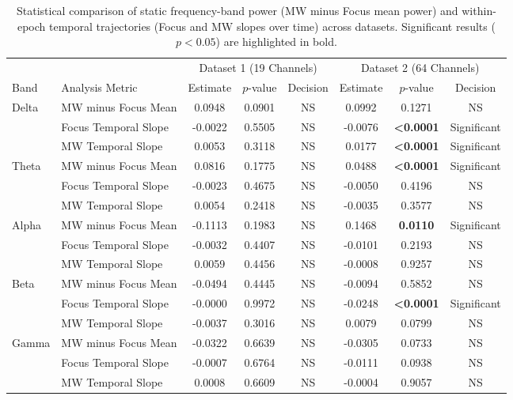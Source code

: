 \documentclass[conference]{IEEEtran}
\begin{document}
\begin{table}[t]
\centering
\caption{Statistical comparison of static frequency-band power (MW minus Focus mean power) and within-epoch temporal trajectories (Focus and MW slopes over time) across datasets. Significant results ($p < 0.05$) are highlighted in bold.}
\label{tab:statistical_comparison}
\begin{tabular}{llccc|ccc}
\toprule
& & \multicolumn{3}{c|}{Dataset 1 (19 Channels)} & \multicolumn{3}{c}{Dataset 2 (64 Channels)} \\
Band & Analysis Metric & Estimate & $p$-value & Decision & Estimate & $p$-value & Decision \\
\midrule
\multirow{3}{*}{Delta}
& MW minus Focus Mean & 0.0948 & 0.0901 & NS & 0.0992 & 0.1271 & NS \\
& Focus Temporal Slope & -0.0022 & 0.5505 & NS & -0.0076 & \textbf{<0.0001} & Significant \\
& MW Temporal Slope & 0.0053 & 0.3118 & NS & 0.0177 & \textbf{<0.0001} & Significant \\
\midrule
\multirow{3}{*}{Theta}
& MW minus Focus Mean & 0.0816 & 0.1775 & NS & 0.0488 & \textbf{<0.0001} & Significant \\
& Focus Temporal Slope & -0.0023 & 0.4675 & NS & -0.0050 & 0.4196 & NS \\
& MW Temporal Slope & 0.0054 & 0.2418 & NS & -0.0035 & 0.3577 & NS \\
\midrule
\multirow{3}{*}{Alpha}
& MW minus Focus Mean & -0.1113 & 0.1983 & NS & 0.1468 & \textbf{0.0110} & Significant \\
& Focus Temporal Slope & -0.0032 & 0.4407 & NS & -0.0101 & 0.2193 & NS \\
& MW Temporal Slope & 0.0059 & 0.4456 & NS & -0.0008 & 0.9257 & NS \\
\midrule
\multirow{3}{*}{Beta}
& MW minus Focus Mean & -0.0494 & 0.4445 & NS & -0.0094 & 0.5852 & NS \\
& Focus Temporal Slope & -0.0000 & 0.9972 & NS & -0.0248 & \textbf{<0.0001} & Significant \\
& MW Temporal Slope & -0.0037 & 0.3016 & NS & 0.0079 & 0.0799 & NS \\
\midrule
\multirow{3}{*}{Gamma}
& MW minus Focus Mean & -0.0322 & 0.6639 & NS & -0.0305 & 0.0733 & NS \\
& Focus Temporal Slope & -0.0007 & 0.6764 & NS & -0.0111 & 0.0938 & NS \\
& MW Temporal Slope & 0.0008 & 0.6609 & NS & -0.0004 & 0.9057 & NS \\
\bottomrule
\end{tabular}
\end{table}
\end{document}
